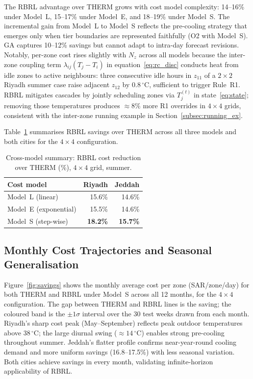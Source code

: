 \documentclass[12pt,a4paper]{article}
\let\oldsubsection\subsection
\renewcommand{\subsection}[1]{\FloatBarrier\oldsubsection{#1}}
\newcommand{\lij}{\lambda_{ij}}
\begin{document}
The RBRL advantage over THERM grows with cost model complexity:
14--16\% under Model~L, 15--17\% under Model~E, and 18--19\% under
Model~S.
The incremental gain from Model~L to Model~S reflects the pre-cooling
strategy that emerges only when tier boundaries are represented
faithfully (O2 with Model~S).
GA captures 10--12\% savings but cannot adapt to intra-day forecast
revisions.
Notably, per-zone cost rises slightly with $N_z$ across all models because
the inter-zone coupling term $\lij(T_j-T_i)$ in equation~\eqref{eq:rc_disc}
conducts heat from idle zones to active neighbours: three consecutive idle
hours in $z_{11}$ of a $2\times2$ Riyadh summer case raise adjacent $z_{12}$
by $0.8\,^\circ$C, sufficient to trigger Rule~R1.
RBRL mitigates cascades by jointly scheduling zones via $T_j^{(t)}$ in
state~\eqref{eq:state}; removing those temperatures produces
$\approx8\%$ more R1 overrides in $4\times4$ grids, consistent with the
inter-zone running example in Section~\ref{subsec:running_ex}.

Table~\ref{tab:cross_model} summarises RBRL savings over THERM across
all three models and both cities for the $4\times4$ configuration.

\begin{table}[!t]
\centering
\caption{Cross-model summary: RBRL cost reduction over THERM (\%),
$4\times4$ grid, summer.}
\label{tab:cross_model}
\setlength{\tabcolsep}{6pt}
\begin{tabularx}{\linewidth}{@{}Xrr@{}}
\toprule
\textbf{Cost model} & \textbf{Riyadh} & \textbf{Jeddah} \\
\midrule
Model~L (linear)      & 15.6\% & 14.6\% \\
Model~E (exponential) & 15.5\% & 14.6\% \\
Model~S (step-wise)   & \textbf{18.2\%} & \textbf{15.7\%} \\
\bottomrule
\end{tabularx}
\end{table}

\subsection{Monthly Cost Trajectories and Seasonal Generalisation}
\label{subsec:seasonal}

Figure~\ref{fig:savings} shows the monthly average cost per zone
(SAR/zone/day) for both THERM and RBRL under Model~S across all
12 months, for the $4\times4$ configuration.
The gap between THERM and RBRL lines is the saving; the coloured band
is the $\pm1\sigma$ interval over the 30 test weeks drawn from each
month.
Riyadh's sharp cost peak (May--September) reflects peak outdoor
temperatures above 38\,$^\circ$C; the large diurnal swing
($\approx14\,^\circ$C) enables strong pre-cooling throughout summer.
Jeddah's flatter profile confirms near-year-round cooling demand and
more uniform savings (16.8--17.5\%) with less seasonal variation.
Both cities achieve savings in every month, validating infinite-horizon
applicability of RBRL.
\end{document}
